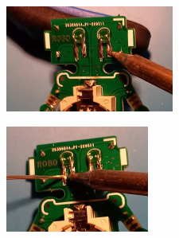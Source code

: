 \documentclass[a4paper]{article}
\begin{document}
\begin{minipage}[t]{0.33\textwidth}
  \centering
  \includegraphics[height=3.5cm]{../pictures/LED7.jpg}
  \label{img:LED7}
  \end{minipage}
\begin{minipage}[t]{0.33\textwidth}
  \centering
  \includegraphics[height=3.5cm]{../pictures/LED8.jpg}
  \label{img:LED8}
\end{minipage}
\end{document}
